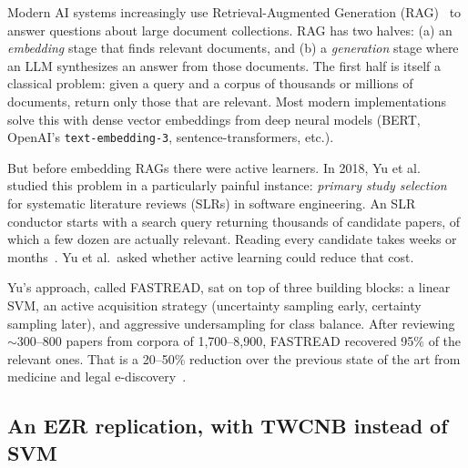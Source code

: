 \documentclass[AMA,STIX2COL]{WileyNJDv5}
\begin{document}
{Modern AI systems increasingly use Retrieval-Augmented
Generation (RAG)~\cite{lewis2020retrieval} to answer questions
about large document collections. RAG has two halves: (a) an
{\em embedding} stage that finds relevant documents, and (b) a
{\em generation} stage where an LLM synthesizes an answer from
those documents. The first half is itself a classical problem:
given a query and a corpus of thousands or millions of
documents, return only those that are relevant. Most modern
implementations solve this with dense vector embeddings from
deep neural models (BERT, OpenAI's \texttt{text-embedding-3},
sentence-transformers, etc.).

But before embedding RAGs there were active learners. In 2018,
Yu et al.~\cite{yu2018finding} studied this problem in a
particularly painful instance: {\em primary study selection}
for systematic literature reviews (SLRs) in software
engineering. An SLR conductor starts with a search query
returning thousands of candidate papers, of which a few dozen
are actually relevant. Reading every candidate takes weeks
or months~\cite{kitchenham2010,carver2013}. Yu et al.\ asked
whether active learning could reduce that cost.

Yu's approach, called FASTREAD, sat on top of three building
blocks: a linear SVM, an active acquisition strategy
(uncertainty sampling early, certainty sampling later), and
aggressive undersampling for class balance. After reviewing
$\sim$300--800 papers from corpora of 1{,}700--8{,}900,
FASTREAD recovered 95\% of the relevant ones. That is a
20--50\% reduction over the previous state of the art from
medicine and legal e-discovery~\cite{wallace2010,miwa2014,
cormack2014}.

\subsection*{An EZR replication, with TWCNB instead of SVM}

}
\end{document}
